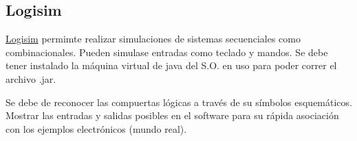 \documentclass{article}
\begin{document}
\subsection{Logisim}

\href{http://www.cburch.com/logisim/index_es.html}{Logisim} permimte 
realizar simulaciones de sistemas secuenciales como 
combinacionales. Pueden simulase entradas  como teclado y 
mandos. Se debe tener instalado la máquina virtual de java del S.O. en uso
para poder correr el archivo .jar.

Se debe de reconocer las compuertas lógicas a través de su símbolos
esquemáticos. Mostrar las entradas y salidas posibles en el software para
su rápida asociación con los ejemplos electrónicos (mundo real).
\end{document}
